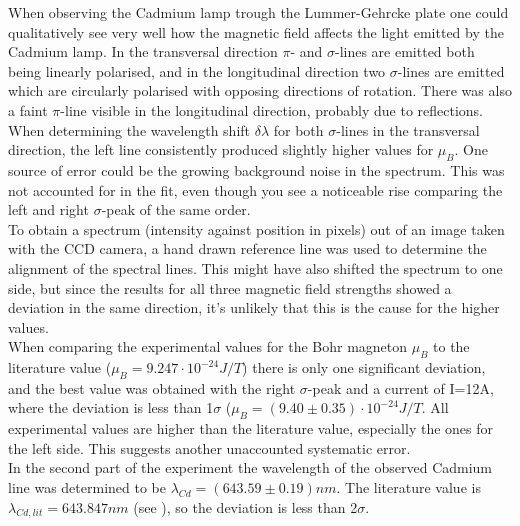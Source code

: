\documentclass[12pt]{article}
\begin{document}
When observing the Cadmium lamp trough the Lummer-Gehrcke plate one could qualitatively see very well how the magnetic field affects the light emitted by the Cadmium lamp. In the transversal direction $\pi$- and $\sigma$-lines are emitted both being linearly polarised, and in the longitudinal direction two $\sigma$-lines are emitted which are circularly polarised with opposing directions of rotation. There was also a faint $\pi$-line visible in the longitudinal direction, probably due to reflections.
\\When determining the wavelength shift $\delta \lambda$ for both $\sigma$-lines in the transversal direction, the left line consistently produced slightly higher values for $\mu_B$. One source of error could be the growing background noise in the spectrum. This was not accounted for in the fit, even though you see a noticeable rise comparing the left and right $\sigma$-peak of the same order. 
\\To obtain a spectrum (intensity against position in pixels) out of an image taken with the CCD camera, a hand drawn reference line was used to determine the alignment of the spectral lines. This might have also shifted the spectrum to one side, but since the results for all three magnetic field strengths showed a deviation in the same direction, it's unlikely that this is the cause for the higher values. 
\\When comparing the experimental values for the Bohr magneton $\mu_B$ to the literature value ($\mu_B=9.247\cdot10^{-24}J/T$) there is only one significant deviation, and the best value was obtained with the right $\sigma$-peak and a current of I=12A, where the deviation is less than 1$\sigma$ ($\mu_B=(9.40\pm0.35)\cdot10^{-24}J/T$. All experimental values are higher than the literature value, especially the ones for the left side. This suggests another unaccounted systematic error.
\\In the second part of the experiment the wavelength of the observed Cadmium line was determined to be $\lambda_{Cd}=(643.59\pm0.19)nm$. The literature value is $\lambda_{Cd, lit}=643.847nm$ (see \cite{nist}), so the deviation is less than 2$\sigma$. 
\end{document}
